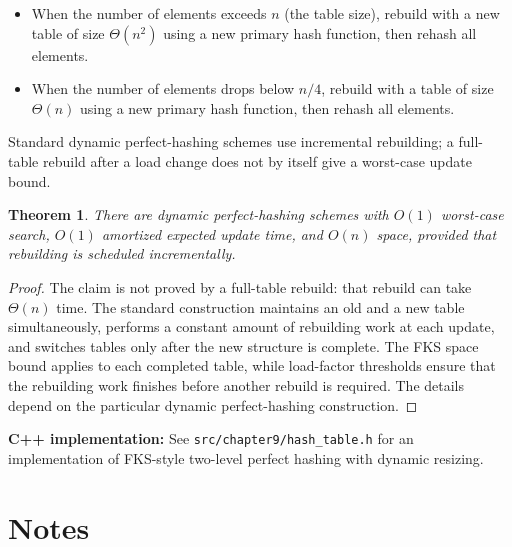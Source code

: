 \documentclass[twoside,12pt]{book}
\theoremstyle{plain}
\newtheorem{theorem}{Theorem}[chapter]
\theoremstyle{definition}
\theoremstyle{remark}
\newenvironment{cpplisting}{\begin{center}\small}{\end{center}}
\begin{document}
\begin{itemize}[nosep]
    \item When the number of elements exceeds $n$ (the table size), rebuild with a new table of size $\Theta(n^2)$ using a new primary hash function, then rehash all elements.
    \item When the number of elements drops below $n/4$, rebuild with a table of size $\Theta(n)$ using a new primary hash function, then rehash all elements.
\end{itemize}

Standard dynamic perfect-hashing schemes use incremental rebuilding; a
full-table rebuild after a load change does not by itself give a worst-case
update bound.

\begin{theorem}\label{thm:dynamic-perfect}
There are dynamic perfect-hashing schemes with $O(1)$ worst-case search,
$O(1)$ amortized expected update time, and $O(n)$ space, provided that
rebuilding is scheduled incrementally.
\end{theorem}

\begin{proof}
The claim is not proved by a full-table rebuild: that rebuild can take
$\Theta(n)$ time.  The standard construction maintains an old and a new
table simultaneously, performs a constant amount of rebuilding work at each
update, and switches tables only after the new structure is complete.  The
FKS space bound applies to each completed table, while load-factor
thresholds ensure that the rebuilding work finishes before another rebuild
is required.  The details depend on the particular dynamic perfect-hashing
construction.
\end{proof}

\begin{cpplisting}
\textbf{C++ implementation:} See \texttt{src/chapter9/hash\_table.h} for an implementation
of FKS-style two-level perfect hashing with dynamic resizing.
\end{cpplisting}

\section*{Notes}
\end{document}
